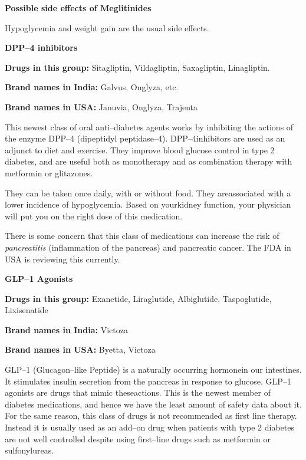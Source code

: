 \noindent\textbf{Possible side effects of Meglitinides}

Hypoglycemia and weight gain are the usual side effects.

\textbf{DPP–4 inhibitors}

\textbf{Drugs in this group:} Sitagliptin, Vildagliptin, Saxagliptin, Lina\-gli\-ptin.

\textbf{Brand names in India:} Galvus, Onglyza, etc.

\textbf{Brand names in USA:} Januvia, Onglyza, Trajenta

\vskip 7pt

This newest class of oral anti–diabetes agents works by inhibi\-ting the actions of the enzyme DPP–4 (dipeptidyl peptidase–4). DPP–4\break inhibitors are used as an adjunct to diet and exercise. They improve blood glucose control in type 2 diabetes, and are useful both as mono\-therapy and as combination therapy with metformin or glitazones.

They can be taken once daily, with or without food. They are\break associated with a lower incidence of hypoglycemia. Based on your\break kidney function, your physician will put you on the right dose of this medication.

There is some concern that this class of medications can increase the risk of \textit{pancreatitis} (inflammation of the pancreas) and pancreatic cancer. The FDA in USA is reviewing this currently.

\vskip 7pt

\textbf{GLP–1 Agonists}

\textbf{Drugs in this group:} Exanetide, Liraglutide, Albiglutide, Taspo\-glutide, Lixisenatide

\textbf{Brand names in India:} Victoza

\textbf{Brand names in USA:} Byetta, Victoza

\vskip 7pt

GLP–1 (Glucagon–like Peptide) is a naturally occurring hormone\break in our intestines. It stimulates insulin secretion from the pancreas in response to glucose. GLP–1 agonists are drugs that mimic these\break actions. This is the newest member of diabetes medications, and hence we have the least amount of safety data about it. For the same reason, this class of drugs is not recommended as first line therapy. Instead it is usually used as an add–on drug when patients with type 2 diabetes are not well controlled despite using first–line drugs such as metformin or sulfonylureas.

